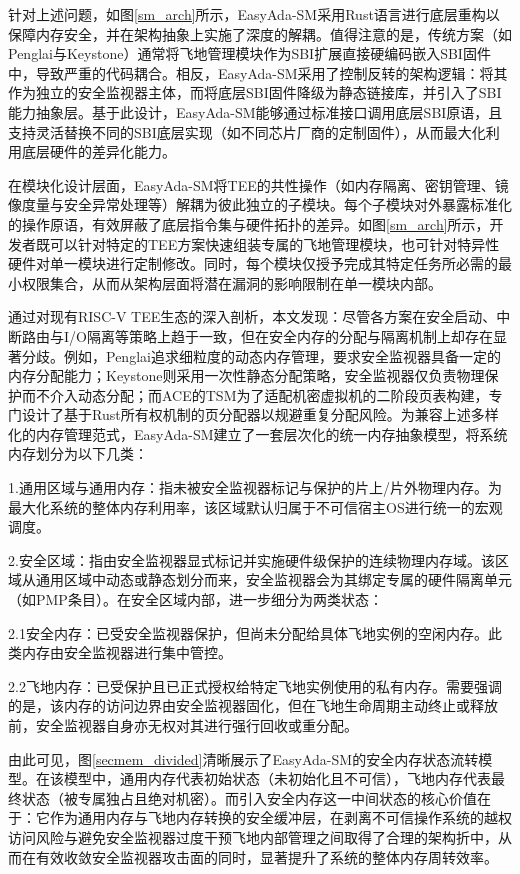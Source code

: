 \documentclass[master, vlined, review]{DissertUESTC}
\begin{document}
	针对上述问题，如图\ref{sm_arch}所示，EasyAda-SM采用Rust语言进行底层重构以保障内存安全，并在架构抽象上实施了深度的解耦。值得注意的是，传统方案（如Penglai与Keystone）通常将飞地管理模块作为SBI扩展直接硬编码嵌入SBI固件中，导致严重的代码耦合。相反，EasyAda-SM采用了控制反转的架构逻辑：将其作为独立的安全监视器主体，而将底层SBI固件降级为静态链接库，并引入了SBI能力抽象层。基于此设计，EasyAda-SM能够通过标准接口调用底层SBI原语，且支持灵活替换不同的SBI底层实现（如不同芯片厂商的定制固件），从而最大化利用底层硬件的差异化能力。

	在模块化设计层面，EasyAda-SM将TEE的共性操作（如内存隔离、密钥管理、镜像度量与安全异常处理等）解耦为彼此独立的子模块。每个子模块对外暴露标准化的操作原语，有效屏蔽了底层指令集与硬件拓扑的差异。如图\ref{sm_arch}所示，开发者既可以针对特定的TEE方案快速组装专属的飞地管理模块，也可针对特异性硬件对单一模块进行定制修改。同时，每个模块仅授予完成其特定任务所必需的最小权限集合，从而从架构层面将潜在漏洞的影响限制在单一模块内部。

	通过对现有RISC-V TEE生态的深入剖析，本文发现：尽管各方案在安全启动、中断路由与I/O隔离等策略上趋于一致，但在安全内存的分配与隔离机制上却存在显著分歧。例如，Penglai追求细粒度的动态内存管理，要求安全监视器具备一定的内存分配能力；Keystone则采用一次性静态分配策略，安全监视器仅负责物理保护而不介入动态分配；而ACE的TSM为了适配机密虚拟机的二阶段页表构建，专门设计了基于Rust所有权机制的页分配器以规避重复分配风险。为兼容上述多样化的内存管理范式，EasyAda-SM建立了一套层次化的统一内存抽象模型，将系统内存划分为以下几类：
	
	1.通用区域与通用内存：指未被安全监视器标记与保护的片上/片外物理内存。为最大化系统的整体内存利用率，该区域默认归属于不可信宿主OS进行统一的宏观调度。
	
	2.安全区域：指由安全监视器显式标记并实施硬件级保护的连续物理内存域。该区域从通用区域中动态或静态划分而来，安全监视器会为其绑定专属的硬件隔离单元（如PMP条目）。在安全区域内部，进一步细分为两类状态：
	
	2.1安全内存：已受安全监视器保护，但尚未分配给具体飞地实例的空闲内存。此类内存由安全监视器进行集中管控。
	
	2.2飞地内存：已受保护且已正式授权给特定飞地实例使用的私有内存。需要强调的是，该内存的访问边界由安全监视器固化，但在飞地生命周期主动终止或释放前，安全监视器自身亦无权对其进行强行回收或重分配。
		
	由此可见，图\ref{secmem_divided}清晰展示了EasyAda-SM的安全内存状态流转模型。在该模型中，通用内存代表初始状态（未初始化且不可信），飞地内存代表最终状态（被专属独占且绝对机密）。而引入安全内存这一中间状态的核心价值在于：它作为通用内存与飞地内存转换的安全缓冲层，在剥离不可信操作系统的越权访问风险与避免安全监视器过度干预飞地内部管理之间取得了合理的架构折中，从而在有效收敛安全监视器攻击面的同时，显著提升了系统的整体内存周转效率。
\end{document}
